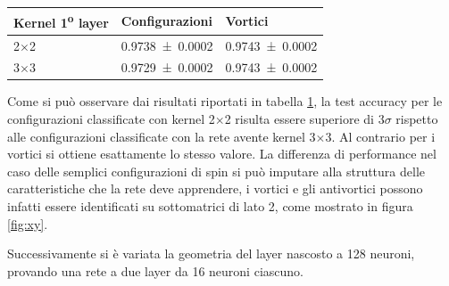 \documentclass{article}
\begin{document}
\begin{table}[ht]
\begin{center}
\begin{tabular}{lll}
\toprule
Kernel 1\textsuperscript{o} layer & Configurazioni & Vortici \\
\midrule
2$\times$2 &\num{0.9738 \pm 0.0002} & \num{0.9743 \pm 0.0002}\\
3$\times$3 & \num{0.9729 \pm 0.0002} &\num{0.9743 \pm 0.0002}\\
\bottomrule
\end{tabular}
\end{center}
\caption{}
\label{tab:2x2vs3x3}
\end{table}

Come si può osservare dai risultati riportati in tabella \ref{tab:2x2vs3x3}, la test accuracy per le configurazioni classificate con kernel 2$\times$2 risulta essere superiore di $3\sigma$ rispetto alle configurazioni classificate con la rete avente kernel 3$\times$3. Al contrario per i vortici si ottiene esattamente lo stesso valore.
La differenza di performance nel caso delle semplici configurazioni di spin si può imputare alla struttura delle caratteristiche che la rete deve apprendere, i vortici e gli antivortici possono infatti essere identificati su sottomatrici di lato 2, come mostrato in figura \ref{fig:xy}.

Successivamente si è variata la geometria del layer nascosto a 128 neuroni, provando una rete a due layer da 16 neuroni ciascuno.







\end{document}
